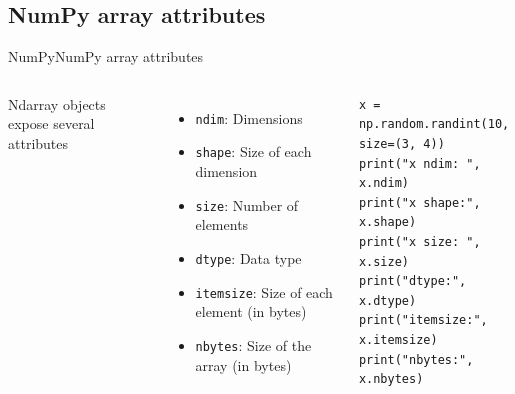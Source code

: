 \documentclass[10pt,compress]{beamer} %
\begin{document}
\subsection{NumPy array attributes}
\begin{frame}[fragile]{NumPy}{NumPy array attributes}
	\begin{columns}
		Ndarray objects expose several attributes
		\begin{itemize}
			\item \texttt{ndim}: Dimensions
			\item \texttt{shape}: Size of each dimension
			\item \texttt{size}: Number of elements
			\item \texttt{dtype}: Data type
			\item \texttt{itemsize}: Size of each element (in bytes)
			\item \texttt{nbytes}: Size of the array (in bytes)
		\end{itemize}

		\begin{exampleblock}{}
		\vspace{-0.2cm} 
			\begin{lstlisting}
x = np.random.randint(10, size=(3, 4))
print("x ndim: ", x.ndim)
print("x shape:", x.shape)
print("x size: ", x.size)
print("dtype:", x.dtype)
print("itemsize:", x.itemsize)
print("nbytes:", x.nbytes)
\end{lstlisting}
		\vspace{-0.2cm} 
		\end{exampleblock}
	\end{columns}
\end{frame}
\end{document}
